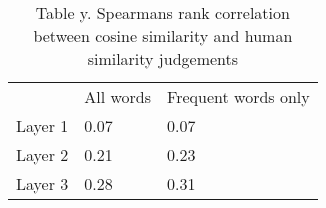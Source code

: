 
\begin{table}[]
	\centering
	\caption{Table y. Spearmans rank correlation between cosine similarity and human similarity judgements} %
	\begin{tabular}{lll}
		& All words      & Frequent words only         \\
		Layer 1 & 0.07 & 0.07 \\
		Layer 2 & 0.21 & 0.23 \\
		Layer 3 & 0.28 & 0.31 
	\end{tabular}
\end{table}

